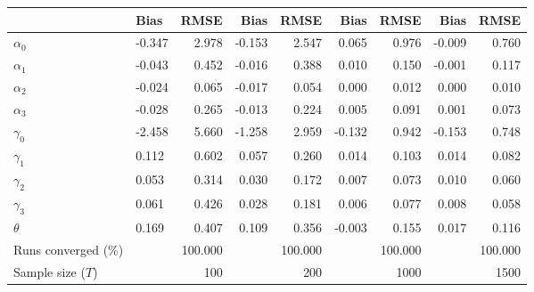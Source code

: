 
\begin{tabular}[t]{llrrrrrrr}
\toprule
  & Bias & RMSE & Bias & RMSE & Bias & RMSE & Bias & RMSE\\
\midrule
$\alpha_{0}$ & -0.347 & 2.978 & -0.153 & 2.547 & 0.065 & 0.976 & -0.009 & 0.760\\
$\alpha_{1}$ & -0.043 & 0.452 & -0.016 & 0.388 & 0.010 & 0.150 & -0.001 & 0.117\\
$\alpha_{2}$ & -0.024 & 0.065 & -0.017 & 0.054 & 0.000 & 0.012 & 0.000 & 0.010\\
$\alpha_{3}$ & -0.028 & 0.265 & -0.013 & 0.224 & 0.005 & 0.091 & 0.001 & 0.073\\
$\gamma_{0}$ & -2.458 & 5.660 & -1.258 & 2.959 & -0.132 & 0.942 & -0.153 & 0.748\\
$\gamma_{1}$ & 0.112 & 0.602 & 0.057 & 0.260 & 0.014 & 0.103 & 0.014 & 0.082\\
$\gamma_{2}$ & 0.053 & 0.314 & 0.030 & 0.172 & 0.007 & 0.073 & 0.010 & 0.060\\
$\gamma_{3}$ & 0.061 & 0.426 & 0.028 & 0.181 & 0.006 & 0.077 & 0.008 & 0.058\\
$\theta$ & 0.169 & 0.407 & 0.109 & 0.356 & -0.003 & 0.155 & 0.017 & 0.116\\
Runs converged (\%) &  & 100.000 &  & 100.000 &  & 100.000 &  & 100.000\\
Sample size ($T$) &  & 100 &  & 200 &  & 1000 &  & 1500\\
\bottomrule
\end{tabular}
